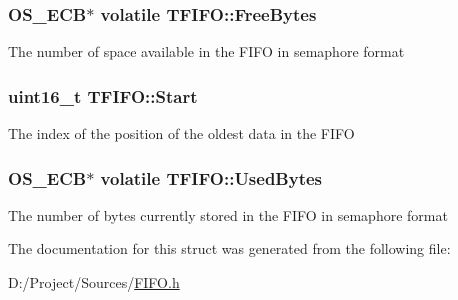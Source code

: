 \subsubsection[{Free\+Bytes}]{\setlength{\rightskip}{0pt plus 5cm}O\+S\+\_\+\+E\+C\+B$\ast$ volatile T\+F\+I\+F\+O\+::\+Free\+Bytes}\label{struct_t_f_i_f_o_aec98d2c207d848180771f62f2ca7c6e7}
The number of space available in the F\+I\+F\+O in semaphore format \hypertarget{struct_t_f_i_f_o_a092a7559431a12616672354641908167}{}
\subsubsection[{Start}]{\setlength{\rightskip}{0pt plus 5cm}uint16\+\_\+t T\+F\+I\+F\+O\+::\+Start}\label{struct_t_f_i_f_o_a092a7559431a12616672354641908167}
The index of the position of the oldest data in the F\+I\+F\+O \hypertarget{struct_t_f_i_f_o_a09fb01c841ada97865836c05b29ddb06}{}
\subsubsection[{Used\+Bytes}]{\setlength{\rightskip}{0pt plus 5cm}O\+S\+\_\+\+E\+C\+B$\ast$ volatile T\+F\+I\+F\+O\+::\+Used\+Bytes}\label{struct_t_f_i_f_o_a09fb01c841ada97865836c05b29ddb06}
The number of bytes currently stored in the F\+I\+F\+O in semaphore format 

The documentation for this struct was generated from the following file\+:\begin{DoxyCompactItemize}
\item 
D\+:/\+Project/\+Sources/\hyperlink{_f_i_f_o_8h}{F\+I\+F\+O.\+h}\end{DoxyCompactItemize}
